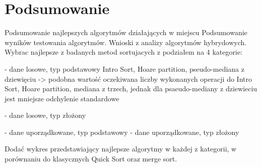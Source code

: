 \chapter{Podsumowanie}
\thispagestyle{chapterBeginStyle}

Podsumowanie najlepszych algorytmów działających w miejscu
Podsumowanie wyników testowania algorytmów. Wnioski z analizy algorytmów hybrydowych.
Wybrac najlepsze z badanych metod sortujacych z podziałem na 4 kategorie:

- dane losowe, typ podstawowy
Intro Sort, Hoare partition, pseudo-mediana z dziewięciu -> podobna wartość oczekiwana liczby wykonanych operacji do Intro Sort, Hoare partition, mediana z trzech, jednak dla psaeudo-mediany z dziewieciu jest mniejsze odchylenie standardowe

- dane losowe, typ złożony

- dane uporządkowane, typ podstawowy
- dane uporządkowane, typ złożony

Dodać wykres przedstawiający najlepsze algorytmy w każdej z kategorii, w porównaniu do klasycznych Quick Sort oraz merge sort.
